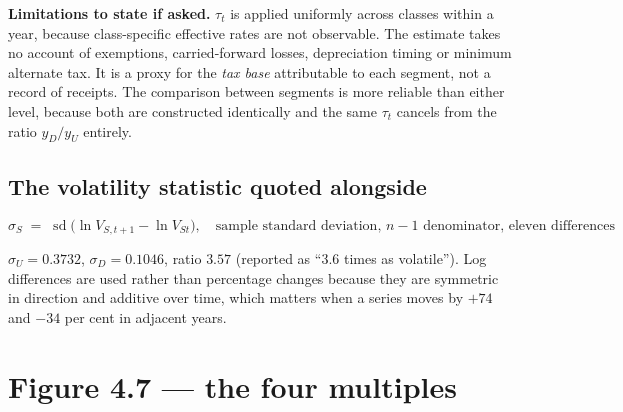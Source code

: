 \documentclass[11pt, a4paper]{article}
\begin{document}
\begin{caution}
\textbf{Limitations to state if asked.} $\tau_t$ is applied uniformly across classes
within a year, because class-specific effective rates are not observable. The
estimate takes no account of exemptions, carried-forward losses, depreciation timing
or minimum alternate tax. It is a proxy for the \emph{tax base} attributable to each
segment, not a record of receipts. The comparison between segments is more reliable
than either level, because both are constructed identically and the same $\tau_t$
cancels from the ratio $y_D/y_U$ entirely.
\end{caution}

\subsection{The volatility statistic quoted alongside}

\[
\sigma_S \;=\; \operatorname{sd}\!\big( \ln V_{S,t+1} - \ln V_{St} \big),
\quad \text{sample standard deviation, } n-1 \text{ denominator, eleven differences}
\]

\begin{table}[H]
\centering\footnotesize
{}
\end{table}

\noindent $\sigma_U = 0.3732$, $\sigma_D = 0.1046$, ratio $\mathbf{3.57}$ (reported as
``3.6 times as volatile''). Log differences are used rather than percentage changes
because they are symmetric in direction and additive over time, which matters when a
series moves by $+74$ and $-34$ per cent in adjacent years.

\section{Figure 4.7 --- the four multiples}
\end{document}
